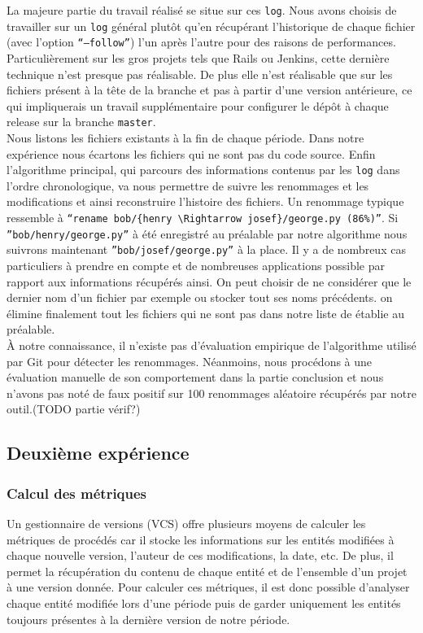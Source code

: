 La majeure partie du travail réalisé se situe sur ces \texttt{log}. Nous avons choisis de travailler sur un \texttt{log} général plutôt qu'en récupérant l'historique de chaque fichier (avec l'option \texttt{``--follow''}) l'un après l'autre pour des raisons de performances. Particulièrement sur les gros projets tels que Rails ou Jenkins, cette dernière technique n'est presque pas réalisable. De plus elle n'est réalisable que sur les fichiers présent à la tête de la branche et pas à partir d'une version antérieure, ce qui impliquerais un travail supplémentaire pour configurer le dépôt à chaque release sur la branche \texttt{master}.\\

Nous listons les fichiers existants à la fin de chaque période. Dans notre expérience nous écartons les fichiers qui ne sont pas du code source. 
Enfin l'algorithme principal, qui parcours des informations contenus par les \texttt{log} dans l'ordre chronologique, va nous permettre de suivre les renommages et les modifications et ainsi reconstruire l'histoire des fichiers. Un renommage typique ressemble à \texttt{``rename bob/\{henry $\Rightarrow$ josef\}/george.py (86\%)''}. Si \texttt{''bob/henry/george.py''} à été enregistré au préalable par notre algorithme nous suivrons maintenant \texttt{''bob/josef/george.py''} à la place. Il y a de nombreux cas particuliers à prendre en compte et de nombreuses applications possible par rapport aux informations récupérés ainsi. On peut choisir de ne considérer que le dernier nom d'un fichier par exemple ou stocker tout ses noms précédents. on élimine finalement tout les fichiers qui ne sont pas dans notre liste de établie au préalable.\\

À notre connaissance, il n'existe pas d'évaluation empirique de l'algorithme utilisé par Git pour détecter les renommages. Néanmoins, nous procédons à une évaluation manuelle de son comportement dans la partie conclusion et nous n'avons pas noté de faux positif sur 100 renommages aléatoire récupérés par notre outil.(TODO partie vérif?)\\

\subsection{Deuxième expérience}

\subsubsection{Calcul des métriques}
Un gestionnaire de versions (VCS) offre plusieurs moyens de calculer les métriques de procédés car il stocke les informations sur les entités modifiées à chaque nouvelle version, l'auteur de ces modifications, la date, etc. De plus, il permet la récupération du contenu de chaque entité et de l'ensemble d'un projet à une version donnée. Pour calculer ces métriques, il est donc possible d'analyser chaque entité modifiée lors d'une période puis de garder uniquement les entités toujours présentes à la dernière version de notre période.

